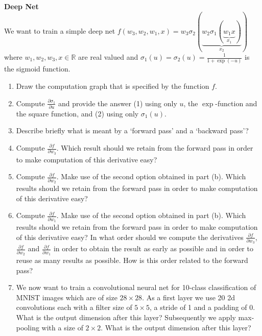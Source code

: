\begin{Q}
\textbf{\Large Deep Net}\\ 

We want to train a simple deep net $f(w_3, w_2, w_1, x) = w_3\sigma_2(\underbrace{w_2\sigma_1(\underbrace{w_1x}_{x_1})}_{x_2})$ where $w_1, w_2, w_3, x\in\mathbb{R}$ are real valued and $\sigma_1(u) = \sigma_2(u) = \frac{1}{1+\exp(-u)}$ is the sigmoid function.

\begin{enumerate}
\item{Draw the computation graph that is specified by the function $f$.
}

\item{Compute $\frac{\partial \sigma_1}{\partial u}$ and provide the answer (1) using only $u$, the $\exp$-function and the square function, and (2) using only $\sigma_1(u)$.
}

\item{Describe briefly what is meant by a `forward pass' and a `backward pass'?
}
\item{Compute $\frac{\partial f}{\partial w_3}$. Which result should we retain from the forward pass in order to make computation of this derivative easy?

}
 
\item{Compute $\frac{\partial f}{\partial w_2}$. Make use of the second option obtained in part (b). Which results should we retain from the forward pass in order to make computation of this derivative easy?
}

\item{Compute $\frac{\partial f}{\partial w_1}$. Make use of the second option obtained in part (b). Which results should we retain from the forward pass in order to make computation of this derivative easy? In what order should we compute the derivatives $\frac{\partial f}{\partial w_3}$, $\frac{\partial f}{\partial w_2}$ and $\frac{\partial f}{\partial w_1}$ in order to obtain the result as early as possible and in order to reuse as many results as possible. How is this order related to the forward pass?
}

\item{We now want to train a convolutional neural net for 10-class classification of MNIST images which are of size $28\times 28$. As a first layer we use 20 2d convolutions each with a filter size of $5 \times 5$, a stride of 1 and a padding of 0. What is the output dimension after this layer? Subsequently we apply max-pooling with a size of $2\times 2$. What is the output dimension after this layer?
}



\end{enumerate}
\end{Q}
